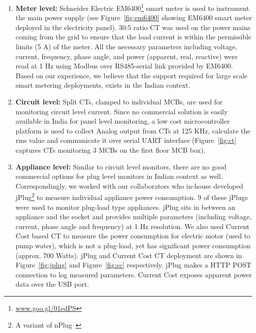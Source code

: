 \documentclass[10pt]{sensys-proc}
\newcommand{\figref}[1]{Figure~\ref{#1}}
\newcommand{\denselistbib}{
  \itemsep -.6pt\topsep-4pt\partopsep-10pt
}
\begin{document}
\begin{enumerate}\denselistbib
\item \textbf{Meter level:} Schneider Electric EM6400\footnote{\url{www.goo.gl/01edPS}} smart meter is used to instrument the main power supply (see \figref{fig:em6400} showing EM6400 smart meter deployed in the electricity panel). %
30:5 ratio CT was used on the power mains coming from the grid to ensure that the load current is within the permissible limits (5 A) of the meter. All the necessary parameters including voltage, current, frequency, phase angle, and power (apparent, real, reactive) were read at 1 Hz using Modbus over RS485-serial link provided by EM6400. Based on our experience, we believe that the support required for large scale smart metering deployments, exists in the Indian context. 

\item \textbf{Circuit level:} Split CTs, clamped to individual MCBs, are used for monitoring circuit level current. Since no commercial solution is easily available in India for panel level monitoring, a low cost microcontroller platform is used to collect Analog output from CTs at 125 KHz, calculate the rms value and communicate it over serial UART interface (\figref{fig:ct} captures CTs monitoring 3 MCBs on the first floor MCB box).

\item \textbf{Appliance level:} Similar to circuit level monitors, there are no good commercial options for plug level monitors in Indian context as well. Correspondingly, we worked with our collaborators who in-house developed jPlug\footnote{A variant of nPlug~\cite{nplug}} to measure individual appliance power consumption. 9 of these jPlugs were used to monitor plug-load type appliances. jPlug sits in between an appliance and the socket and provides multiple parameters (including voltage, current, phase angle and frequency) at 1 Hz resolution. We also used Current Cost based CT to measure the power consumption for electric motor (used to pump water), which is not a plug-load, yet has significant power consumption (approx. 700 Watts). jPlug and Current Cost CT deployment are shown in \figref{fig:jplug} and \figref{fig:cc} respectively. jPlug makes a HTTP POST connection to log measured parameters. Current Cost exposes apparent power data over the USB port. 
\end{enumerate}
\end{document}
